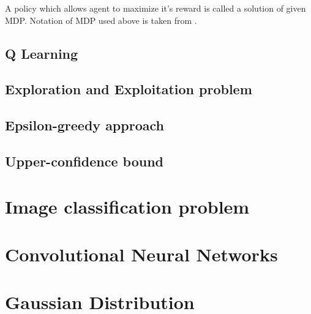 A policy which allows agent to maximize it's reward is called a solution of given MDP. Notation of MDP used above is taken from \cite{Thomas15a}.

\subsection{Q Learning}
\subsection{Exploration and Exploitation problem}
\subsection{Epsilon-greedy approach}
\subsection{Upper-confidence bound}
\section{Image classification problem}
\section{Convolutional Neural Networks}
\section{Gaussian Distribution}



